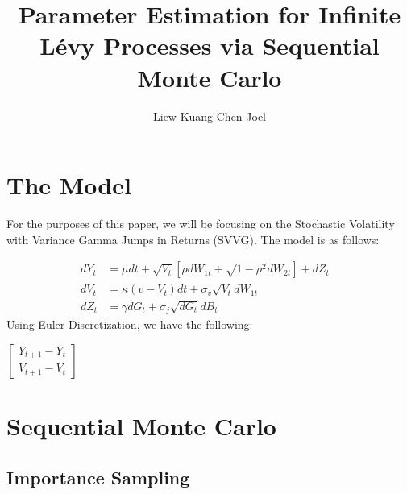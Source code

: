 \documentclass[11pt]{article}
\title{Parameter Estimation for Infinite L\'{e}vy Processes via Sequential Monte Carlo}
\author{Liew Kuang Chen Joel}
\begin{document}
\maketitle
\newpage 
\section{The Model}
For the purposes of this paper, we will be focusing on the Stochastic Volatility with Variance Gamma Jumps in Returns (SVVG). The model is as follows:


\begin{equation}
	\begin{aligned}
		dY_{t} &=\mu dt+\sqrt{V_{t}}[\rho dW_{1t}+\sqrt{1-\rho ^{2}} dW_{2t}] + dZ_{t} &\\
		dV_{t} &= \kappa (v - V_{t})dt+\sigma _{v}\sqrt{V_{t}}dW_{1t} &\\
		dZ_{t} &= \gamma dG_{t} + \sigma _{j} \sqrt{dG_{t}}dB_{t}
	\end{aligned}
\end{equation}
Using Euler Discretization, we have the following:

$
\begin{bmatrix}
Y_{t+1} - Y_{t}\\
V_{t+1} - V_{t}
\end{bmatrix}
$


\section{Sequential Monte Carlo}
\subsection{Importance Sampling}
\end{document}
